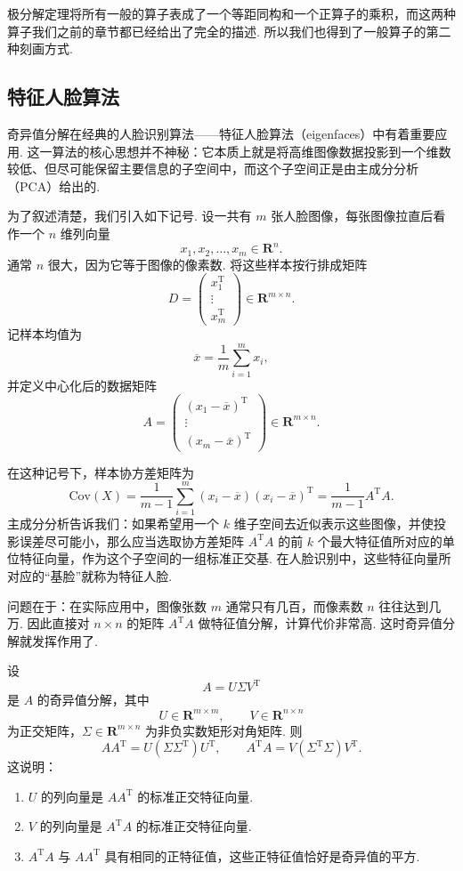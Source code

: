 极分解定理将所有一般的算子表成了一个等距同构和一个正算子的乘积，而这两种算子我们之前的章节都已经给出了完全的描述. 所以我们也得到了一般算子的第二种刻画方式.

\subsection{特征人脸算法}

奇异值分解在经典的人脸识别算法——特征人脸算法（eigenfaces）中有着重要应用. 这一算法的核心思想并不神秘：它本质上就是将高维图像数据投影到一个维数较低、但尽可能保留主要信息的子空间中，而这个子空间正是由主成分分析（PCA）给出的.

为了叙述清楚，我们引入如下记号. 设一共有 $m$ 张人脸图像，每张图像拉直后看作一个 $n$ 维列向量
\[
    x_1, x_2, \ldots, x_m \in \mathbf{R}^n.
\]
通常 $n$ 很大，因为它等于图像的像素数. 将这些样本按行排成矩阵
\[
    D =
    \begin{pmatrix}
        x_1^{\mathrm{T}} \\
        \vdots           \\
        x_m^{\mathrm{T}}
    \end{pmatrix}
    \in \mathbf{R}^{m \times n}.
\]
记样本均值为
\[
    \overline{x} = \frac{1}{m}\sum_{i=1}^m x_i,
\]
并定义中心化后的数据矩阵
\[
    A =
    \begin{pmatrix}
        (x_1-\overline{x})^{\mathrm{T}} \\
        \vdots                          \\
        (x_m-\overline{x})^{\mathrm{T}}
    \end{pmatrix}
    \in \mathbf{R}^{m \times n}.
\]

在这种记号下，样本协方差矩阵为
\[
    \mathrm{Cov}(X)
    = \frac{1}{m-1}\sum_{i=1}^m (x_i-\overline{x})(x_i-\overline{x})^{\mathrm{T}}
    = \frac{1}{m-1}A^{\mathrm{T}}A.
\]
主成分分析告诉我们：如果希望用一个 $k$ 维子空间去近似表示这些图像，并使投影误差尽可能小，那么应当选取协方差矩阵 $A^{\mathrm{T}}A$ 的前 $k$ 个最大特征值所对应的单位特征向量，作为这个子空间的一组标准正交基. 在人脸识别中，这些特征向量所对应的“基脸”就称为特征人脸.

问题在于：在实际应用中，图像张数 $m$ 通常只有几百，而像素数 $n$ 往往达到几万. 因此直接对 $n \times n$ 的矩阵 $A^{\mathrm{T}}A$ 做特征值分解，计算代价非常高. 这时奇异值分解就发挥作用了.

设
\[
    A = U\Sigma V^{\mathrm{T}}
\]
是 $A$ 的奇异值分解，其中
\[
    U \in \mathbf{R}^{m \times m},\qquad V \in \mathbf{R}^{n \times n}
\]
为正交矩阵，$\Sigma \in \mathbf{R}^{m \times n}$ 为非负实数矩形对角矩阵. 则
\[
    AA^{\mathrm{T}} = U(\Sigma \Sigma^{\mathrm{T}})U^{\mathrm{T}},\qquad
    A^{\mathrm{T}}A = V(\Sigma^{\mathrm{T}}\Sigma)V^{\mathrm{T}}.
\]
这说明：
\begin{enumerate}
    \item $U$ 的列向量是 $AA^{\mathrm{T}}$ 的标准正交特征向量.

    \item $V$ 的列向量是 $A^{\mathrm{T}}A$ 的标准正交特征向量.

    \item $A^{\mathrm{T}}A$ 与 $AA^{\mathrm{T}}$ 具有相同的正特征值，这些正特征值恰好是奇异值的平方.
\end{enumerate}

